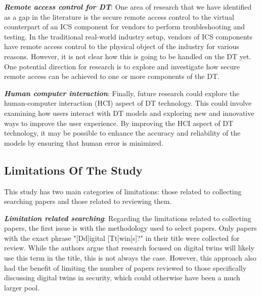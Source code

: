 \textbf{\textit{Remote access control for DT}}: One area of research that we have identified as a gap in the literature is the secure remote access control to the virtual counterpart of an ICS component for vendors to perform troubleshooting and testing. In the traditional real-world industry setup, vendors of ICS components have remote access control to the physical object of the industry for various reasons. However, it is not clear how this is going to be handled on the DT yet. One potential direction for research is to explore and investigate how secure remote access can be achieved to one or more components of the DT.

\textbf{\textit{Human computer interaction}}: Finally, future research could explore the human-computer interaction (HCI) aspect of DT technology. This could involve examining how users interact with DT models and exploring new and innovative ways to improve the user experience. By improving the HCI aspect of DT technology, it may be possible to enhance the accuracy and reliability of the models by ensuring that human error is minimized.

\subsection{Limitations Of The Study}
% 
This study has two main categories of limitations: those related to collecting searching papers and those related to reviewing them.

\textbf{\textit{Limitation related searching}}: Regarding the limitations related to collecting papers, the first issue is with the methodology used to select papers. Only papers with the exact phrase "[Dd]igital [Tt]win[s]?" in their title were collected for review. While the authors argue that research focused on digital twins will likely use this term in the title, this is not always the case. However, this approach also had the benefit of limiting the number of papers reviewed to those specifically discussing digital twins in security, which could otherwise have been a much larger pool. 


